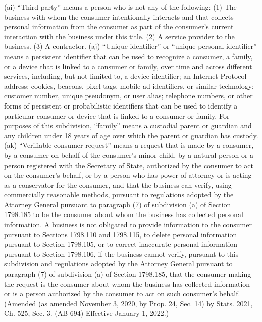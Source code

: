 (ai) “Third party” means a person who is not any of the following:
(1) The business with whom the consumer intentionally interacts and that collects personal information from the consumer as part of the consumer’s current interaction with the business under this title.
(2) A service provider to the business.
(3) A contractor.
(aj) “Unique identifier” or “unique personal identifier” means a persistent identifier that can be used to recognize a consumer, a family, or a device that is linked to a consumer or family, over time and across different services, including, but not limited to, a device identifier; an Internet Protocol address; cookies, beacons, pixel tags, mobile ad identifiers, or similar technology; customer number, unique pseudonym, or user alias; telephone numbers, or other forms of persistent or probabilistic identifiers that can be used to identify a particular consumer or device that is linked to a consumer or family. For purposes of this subdivision, “family” means a custodial parent or guardian and any children under 18 years of age over which the parent or guardian has custody.
(ak) “Verifiable consumer request” means a request that is made by a consumer, by a consumer on behalf of the consumer’s minor child, by a natural person or a person registered with the Secretary of State, authorized by the consumer to act on the consumer’s behalf, or by a person who has power of attorney or is acting as a conservator for the consumer, and that the business can verify, using commercially reasonable methods, pursuant to regulations adopted by the Attorney General pursuant to paragraph (7) of subdivision (a) of Section 1798.185 to be the consumer about whom the business has collected personal information. A business is not obligated to provide information to the consumer pursuant to Sections 1798.110 and 1798.115, to delete personal information pursuant to Section 1798.105, or to correct inaccurate personal information pursuant to Section 1798.106, if the business cannot verify, pursuant to this subdivision and regulations adopted by the Attorney General pursuant to paragraph (7) of subdivision (a) of Section 1798.185, that the consumer making the request is the consumer about whom the business has collected information or is a person authorized by the consumer to act on such consumer’s behalf.
(Amended (as amended November 3, 2020, by Prop. 24, Sec. 14) by Stats. 2021, Ch. 525, Sec. 3. (AB 694) Effective January 1, 2022.)

